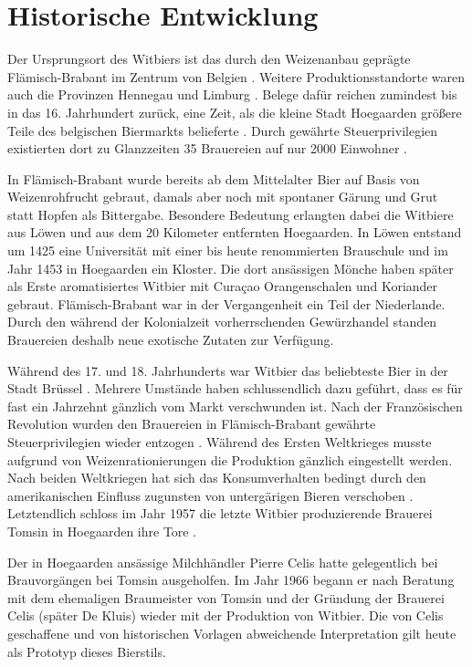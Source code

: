 \documentclass[a4paper,parskip=half]{scrartcl}
\begin{document}
\section*{Historische Entwicklung}

Der Ursprungsort des Witbiers ist das durch den Weizenanbau geprägte
Flämisch-Brabant im Zentrum von Belgien \parencite[44]{Roncoroni2018}.
Weitere Produktionsstandorte waren auch die Provinzen Hennegau und
Limburg \parencite[118]{Strottner1999}.
Belege dafür reichen zumindest bis in das 16. Jahrhundert
zurück, eine Zeit, als die kleine Stadt Hoegaarden größere
Teile des belgischen Biermarkts belieferte \parencite[46]{Mulder2020}. 
Durch gewährte Steuerprivilegien existierten dort zu Glanzzeiten 35
Brauereien auf nur 2000 Einwohner \parencite[27]{Sparrow2002}.

In Flämisch-Brabant wurde bereits ab dem Mittelalter Bier auf
Basis von Weizenrohfrucht gebraut, damals aber noch mit
spontaner Gärung und Grut statt Hopfen als Bittergabe.
Besondere Bedeutung erlangten dabei die Witbiere aus Löwen
und aus dem 20 Kilometer entfernten Hoegaarden. In Löwen
entstand um 1425 eine Universität mit einer bis heute renommierten Brauschule
und im Jahr 1453 in Hoegaarden ein Kloster. Die dort ansässigen
Mönche haben später als Erste aromatisiertes Witbier mit
Curaçao Orangenschalen und Koriander gebraut. Flämisch-Brabant war
in der Vergangenheit ein Teil der Niederlande. Durch den während der
Kolonialzeit vorherrschenden Gewürzhandel standen
Brauereien deshalb neue exotische Zutaten zur Verfügung.
\parencite[1,4]{Strottner1999}

Während des 17. und 18. Jahrhunderts war Witbier das beliebteste Bier
in der Stadt Brüssel \parencite{Zainasheff2007}.
Mehrere Umstände haben schlussendlich dazu geführt, dass
es für fast ein Jahrzehnt gänzlich vom Markt verschwunden ist.
Nach der Französischen Revolution wurden den Brauereien in
Flämisch-Brabant gewährte Steuerprivilegien wieder entzogen
\parencite[44]{Roncoroni2018}. Während des Ersten Weltkrieges
musste aufgrund von Weizenrationierungen die Produktion gänzlich
eingestellt werden. Nach beiden Weltkriegen hat sich
das Konsumverhalten bedingt durch den amerikanischen
Einfluss zugunsten von untergärigen Bieren verschoben \parencite[4]{Strottner1999}.
Letztendlich schloss im Jahr 1957 die letzte
Witbier produzierende Brauerei Tomsin in Hoegaarden ihre Tore \parencite[44]{Roncoroni2018}.

Der in Hoegaarden ansässige Milchhändler Pierre
Celis hatte gelegentlich bei Brauvorgängen bei Tomsin ausgeholfen. Im
Jahr 1966 begann er nach Beratung mit dem ehemaligen
Braumeister von Tomsin und der Gründung der Brauerei Celis
(später De Kluis) wieder mit der Produktion von Witbier. Die von
Celis geschaffene und von historischen Vorlagen abweichende Interpretation
gilt heute als Prototyp dieses Bierstils.
\parencite[37,49]{Hieronymus2010} 
\end{document}
